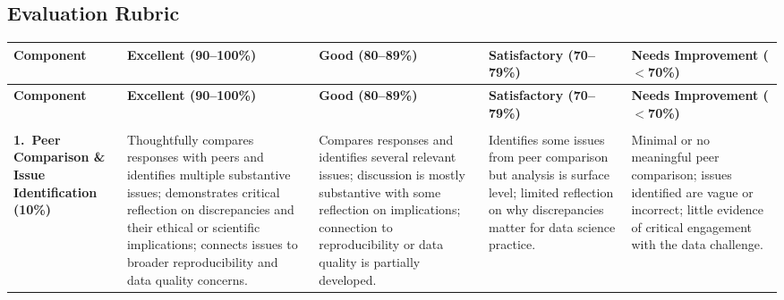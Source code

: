 \begin{landscape}

    \section{Evaluation Rubric}

    {\footnotesize

    \begin{longtable}{%
        >{\RaggedRight\arraybackslash}p{2.5cm}   %
        >{\RaggedRight\arraybackslash}p{4.5cm}   %
        >{\RaggedRight\arraybackslash}p{4.2cm}   %
        >{\RaggedRight\arraybackslash}p{4.2cm}   %
        >{\RaggedRight\arraybackslash}p{4.5cm}}  %

    \toprule
    \textbf{Component} &
    \textbf{Excellent (90--100\%)} &
    \textbf{Good (80--89\%)} &
    \textbf{Satisfactory (70--79\%)} &
    \textbf{Needs Improvement ($<$70\%)} \\
    \midrule
    \endfirsthead

    \toprule
    \textbf{Component} &
    \textbf{Excellent (90--100\%)} &
    \textbf{Good (80--89\%)} &
    \textbf{Satisfactory (70--79\%)} &
    \textbf{Needs Improvement ($<$70\%)} \\
    \midrule
    \endhead

    \midrule
    \multicolumn{5}{r}{\textit{Continued on next page}} \\
    \endfoot

    \bottomrule
    \endlastfoot

    \textbf{1.\ Peer Comparison \& Issue Identification}
    \newline\textbf{(10\%)}
    &
    Thoughtfully compares responses with peers and identifies multiple
    substantive issues; demonstrates critical reflection on discrepancies
    and their ethical or scientific implications; connects issues to
    broader reproducibility and data quality concerns.
    &
    Compares responses and identifies several relevant issues; discussion
    is mostly substantive with some reflection on implications; connection
    to reproducibility or data quality is partially developed.
    &
    Identifies some issues from peer comparison but analysis is surface
    level; limited reflection on why discrepancies matter for data
    science practice.
    &
    Minimal or no meaningful peer comparison; issues identified are vague
    or incorrect; little evidence of critical engagement with the data
    challenge.
    \\
    \midrule


\end{longtable}}
\end{landscape}
